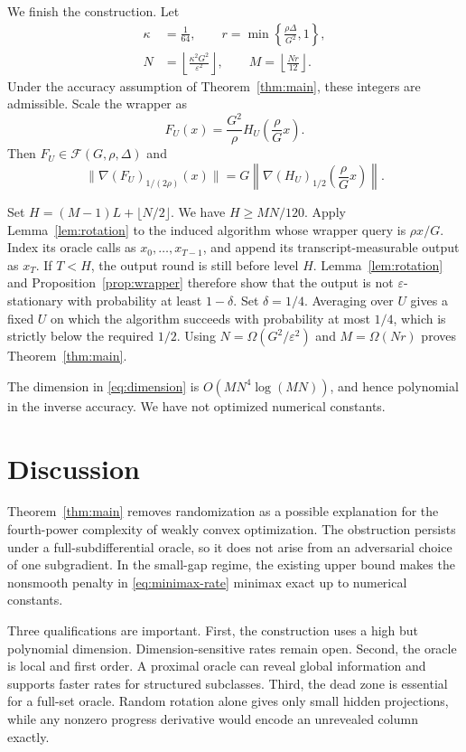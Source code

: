 \documentclass[twoside]{article}
\newcommand{\cF}{\mathcal F}
\newcommand{\ve}{\varepsilon}
\begin{document}
We finish the construction. Let
\begin{align*}
 \kappa&=\frac1{64},\qquad
 r=\min\left\{\frac{\rho\Delta}{G^2},1\right\},\\
 N&=\left\lfloor\frac{\kappa^2G^2}{\ve^2}\right\rfloor,
 \qquad M=\left\lfloor\frac{Nr}{12}\right\rfloor.
\end{align*}
Under the accuracy assumption of Theorem~\ref{thm:main}, these integers are admissible. Scale the wrapper as
\begin{equation}
 F_U(x)=\frac{G^2}{\rho}
 H_U\left(\frac{\rho}{G}x\right).
 \label{eq:scaling}
\end{equation}
Then $F_U\in\cF(G,\rho,\Delta)$ and \[ \|\nabla(F_U)_{1/(2\rho)}(x)\| =G\left\|\nabla(H_U)_{1/2} \left(\frac{\rho}{G}x\right)\right\|. \]

Set $H=(M-1)L+\lfloor N/2\rfloor$. We have $H\geq MN/120$. Apply Lemma~\ref{lem:rotation} to the induced algorithm whose wrapper query is $\rho x/G$. Index its oracle calls as $x_0,\ldots,x_{T-1}$, and append its transcript-measurable output as $x_T$. If $T<H$, the output round is still before level $H$. Lemma~\ref{lem:rotation} and Proposition~\ref{prop:wrapper} therefore show that the output is not $\ve$-stationary with probability at least $1-\delta$. Set $\delta=1/4$. Averaging over $U$ gives a fixed $U$ on which the algorithm succeeds with probability at most $1/4$, which is strictly below the required $1/2$. Using $N=\Omega(G^2/\ve^2)$ and $M=\Omega(Nr)$ proves Theorem~\ref{thm:main}.

The dimension in \eqref{eq:dimension} is $O(MN^4\log(MN))$, and hence polynomial in the inverse accuracy. We have not optimized numerical constants.

\section{Discussion}
\label{sec:discussion}

Theorem~\ref{thm:main} removes randomization as a possible explanation for the fourth-power complexity of weakly convex optimization. The obstruction persists under a full-subdifferential oracle, so it does not arise from an adversarial choice of one subgradient. In the small-gap regime, the existing upper bound makes the nonsmooth penalty in \eqref{eq:minimax-rate} minimax exact up to numerical constants.

Three qualifications are important. First, the construction uses a high but polynomial dimension. Dimension-sensitive rates remain open. Second, the oracle is local and first order. A proximal oracle can reveal global information and supports faster rates for structured subclasses. Third, the dead zone is essential for a full-set oracle. Random rotation alone gives only small hidden projections, while any nonzero progress derivative would encode an unrevealed column exactly.
\end{document}
